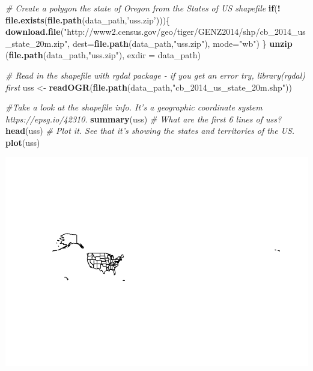 \documentclass[
]{article}
\newenvironment{Shaded}{\begin{snugshade}}{\end{snugshade}}
\newcommand{\CommentTok}[1]{\textcolor[rgb]{0.56,0.35,0.01}{\textit{#1}}}
\newcommand{\ControlFlowTok}[1]{\textcolor[rgb]{0.13,0.29,0.53}{\textbf{#1}}}
\newcommand{\DataTypeTok}[1]{\textcolor[rgb]{0.13,0.29,0.53}{#1}}
\newcommand{\KeywordTok}[1]{\textcolor[rgb]{0.13,0.29,0.53}{\textbf{#1}}}
\newcommand{\NormalTok}[1]{#1}
\newcommand{\OperatorTok}[1]{\textcolor[rgb]{0.81,0.36,0.00}{\textbf{#1}}}
\newcommand{\StringTok}[1]{\textcolor[rgb]{0.31,0.60,0.02}{#1}}
\begin{document}
\begin{Shaded}
\begin{Highlighting}[]
\CommentTok{# Create a polygon the state of Oregon from the States of US shapefile}
\ControlFlowTok{if}\NormalTok{(}\OperatorTok{!}\StringTok{ }\KeywordTok{file.exists}\NormalTok{(}\KeywordTok{file.path}\NormalTok{(data_path,}\StringTok{'uss.zip'}\NormalTok{)))\{}
  \KeywordTok{download.file}\NormalTok{(}\StringTok{"http://www2.census.gov/geo/tiger/GENZ2014/shp/cb_2014_us_state_20m.zip"}\NormalTok{, }\DataTypeTok{dest=}\KeywordTok{file.path}\NormalTok{(data_path,}\StringTok{"uss.zip"}\NormalTok{), }\DataTypeTok{mode=}\StringTok{"wb"}\NormalTok{) }
\NormalTok{\}}
\KeywordTok{unzip}\NormalTok{ (}\KeywordTok{file.path}\NormalTok{(data_path,}\StringTok{"uss.zip"}\NormalTok{), }\DataTypeTok{exdir =}\NormalTok{ data_path)}

\CommentTok{# Read in the shapefile with rgdal package - if you get an error try, library(rgdal) first}
\NormalTok{uss <-}\StringTok{ }\KeywordTok{readOGR}\NormalTok{(}\KeywordTok{file.path}\NormalTok{(data_path,}\StringTok{"cb_2014_us_state_20m.shp"}\NormalTok{))}

\CommentTok{#Take a look at the shapefile info. It's a geographic coordinate system  https://epsg.io/42310.}
\KeywordTok{summary}\NormalTok{(uss)}
\CommentTok{# What are the first 6 lines of uss?}
\KeywordTok{head}\NormalTok{(uss)}
\CommentTok{# Plot it. See that it's showing the states and territories of the US.}
\KeywordTok{plot}\NormalTok{(uss)}
\end{Highlighting}
\end{Shaded}

\includegraphics{lab3_patch_design_files/figure-latex/unnamed-chunk-2-1.pdf}
\end{document}
